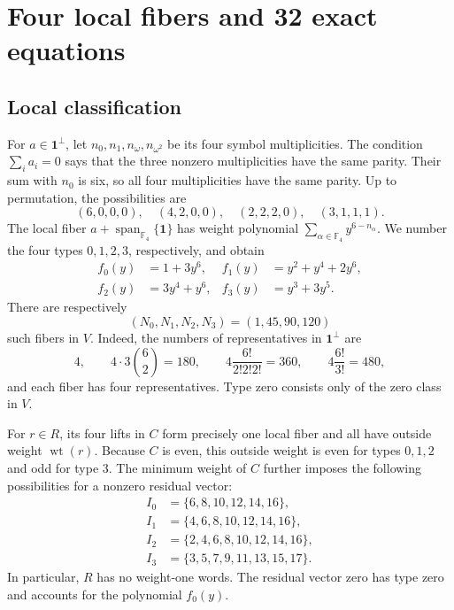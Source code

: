 \documentclass[11pt]{article}
\theoremstyle{remark}
\newcommand{\F}{\mathbb F_4}
\newcommand{\wt}{\operatorname{wt}}
\newcommand{\Span}{\operatorname{span}_{\F}}
\begin{document}
\section{Four local fibers and 32 exact equations}

\subsection{Local classification}

For $a\in\boldsymbol1^\perp$, let $n_0,n_1,n_\omega,n_{\omega^2}$
be its four symbol multiplicities.  The condition
$\sum_i a_i=0$ says that the three nonzero multiplicities have the same
parity.  Their sum with $n_0$ is six, so all four multiplicities have
the same parity.  Up to permutation, the possibilities are
\[
 (6,0,0,0),\quad(4,2,0,0),\quad(2,2,2,0),\quad(3,1,1,1).
\]
The local fiber $a+\Span\{\boldsymbol1\}$ has weight polynomial
$\sum_{\alpha\in\F}y^{6-n_\alpha}$.  We number the four types
$0,1,2,3$, respectively, and obtain
\begin{equation}
\begin{aligned}
 f_0(y)&=1+3y^6,&
 f_1(y)&=y^2+y^4+2y^6,\\
 f_2(y)&=3y^4+y^6,&
 f_3(y)&=y^3+3y^5.
\end{aligned}
\label{eq:fibers}
\end{equation}
There are respectively
\begin{equation}
 (N_0,N_1,N_2,N_3)=(1,45,90,120)
 \label{eq:type-counts}
\end{equation}
such fibers in $V$.  Indeed, the numbers of representatives in
$\boldsymbol1^\perp$ are
\[
 4,\qquad 4\cdot3\binom62=180,\qquad
 4\frac{6!}{2!2!2!}=360,\qquad
 4\frac{6!}{3!}=480,
\]
and each fiber has four representatives.
Type zero consists only of the zero class in $V$.

For $r\in R$, its four lifts in $C$ form precisely one local fiber
and all have outside weight $\wt(r)$.  Because $C$ is even, this
outside weight is even for types $0,1,2$ and odd for type $3$.
The minimum weight of $C$ further imposes the following possibilities
for a nonzero residual vector:
\begin{equation}
\begin{aligned}
 I_0&=\{6,8,10,12,14,16\},\\
 I_1&=\{4,6,8,10,12,14,16\},\\
 I_2&=\{2,4,6,8,10,12,14,16\},\\
 I_3&=\{3,5,7,9,11,13,15,17\}.
\end{aligned}
\label{eq:allowed}
\end{equation}
In particular, $R$ has no weight-one words.  The residual vector zero
has type zero and accounts for the polynomial $f_0(y)$.
\end{document}
